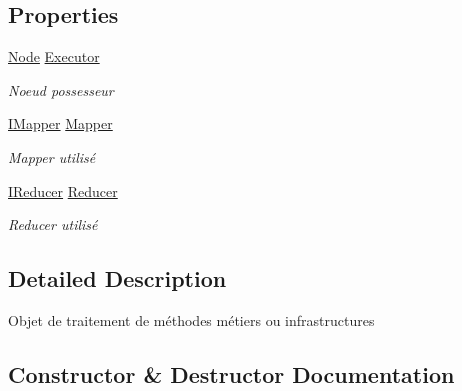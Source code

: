 \subsection*{Properties}
\begin{DoxyCompactItemize}
\item 
\hyperlink{class_node_net_1_1_network_1_1_nodes_1_1_node}{Node} \hyperlink{class_node_net_1_1_tasks_1_1_task_executor_a0761c0955745e5f4d26d5342321599c8}{Executor}
\begin{DoxyCompactList}\small\item\em Noeud possesseur \end{DoxyCompactList}\item 
\hyperlink{interface_node_net_1_1_map___reduce_1_1_i_mapper}{I\+Mapper} \hyperlink{class_node_net_1_1_tasks_1_1_task_executor_aa4f120494ffb855dfcd54d6db8e8e8a3}{Mapper}
\begin{DoxyCompactList}\small\item\em Mapper utilisé \end{DoxyCompactList}\item 
\hyperlink{interface_node_net_1_1_map___reduce_1_1_i_reducer}{I\+Reducer} \hyperlink{class_node_net_1_1_tasks_1_1_task_executor_abf048f920835d49ef8333f7be7249de1}{Reducer}
\begin{DoxyCompactList}\small\item\em Reducer utilisé \end{DoxyCompactList}\end{DoxyCompactItemize}


\subsection{Detailed Description}
Objet de traitement de méthodes métiers ou infrastructures 



\subsection{Constructor \& Destructor Documentation}
\mbox{\label{class_node_net_1_1_tasks_1_1_task_executor_a30c5b0e9e3d5e6e6ec08889a43c9c9a2}} 
